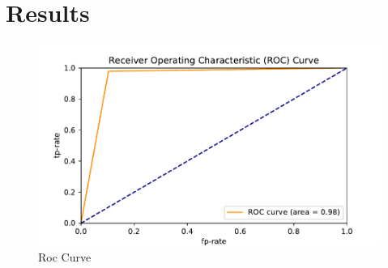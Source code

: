 \section{Results}




\begin{figure}
    \centering
    \includegraphics[width=\textwidth]{results/roc.pdf}
    \caption{Roc Curve}
    \label{fig:my_label}
\end{figure}

